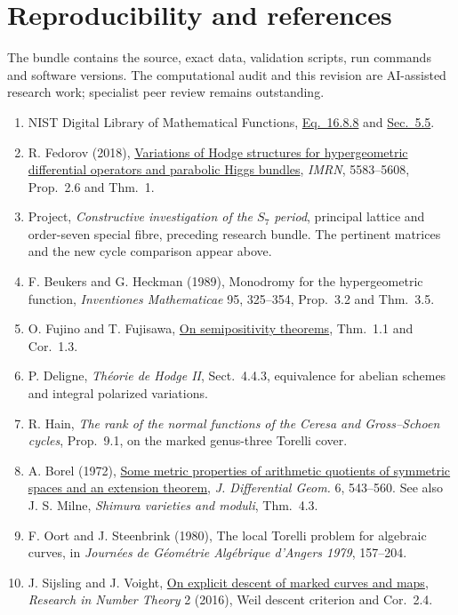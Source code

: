 \documentclass[10pt]{article}
\begin{document}
\clearpage\section*{Reproducibility and references}
The bundle contains the source, exact data, validation scripts, run commands and software versions. The computational audit and this revision are AI-assisted research work; specialist peer review remains outstanding.
\begin{enumerate}
\item NIST Digital Library of Mathematical Functions, \href{https://dlmf.nist.gov/16.8.E8}{Eq.~16.8.8} and \href{https://dlmf.nist.gov/5.5}{Sec.~5.5}.
\item R. Fedorov (2018), \href{https://doi.org/10.1093/imrn/rnx044}{Variations of Hodge structures for hypergeometric differential operators and parabolic Higgs bundles}, \emph{IMRN}, 5583--5608, Prop.~2.6 and Thm.~1.
\item Project, \emph{Constructive investigation of the $S_7$ period}, principal lattice and order-seven special fibre, preceding research bundle. The pertinent matrices and the new cycle comparison appear above.
\item F. Beukers and G. Heckman (1989), Monodromy for the hypergeometric function, \emph{Inventiones Mathematicae} 95, 325--354, Prop.~3.2 and Thm.~3.5.
\item O. Fujino and T. Fujisawa, \href{https://www.math.kyoto-u.ac.jp/~fujino/OnSemipositivity6.pdf}{On semipositivity theorems}, Thm.~1.1 and Cor.~1.3.
\item P. Deligne, \emph{Th\'eorie de Hodge II}, Sect.~4.4.3, equivalence for abelian schemes and integral polarized variations.
\item R. Hain, \emph{The rank of the normal functions of the Ceresa and Gross--Schoen cycles}, Prop.~9.1, on the marked genus-three Torelli cover.
\item A. Borel (1972), \href{https://doi.org/10.4310/jdg/1214430642}{Some metric properties of arithmetic quotients of symmetric spaces and an extension theorem}, \emph{J. Differential Geom.} 6, 543--560. See also J. S. Milne, \emph{Shimura varieties and moduli}, Thm.~4.3.
\item F. Oort and J. Steenbrink (1980), The local Torelli problem for algebraic curves, in \emph{Journ\'ees de G\'eom\'etrie Alg\'ebrique d'Angers 1979}, 157--204.
\item J. Sijsling and J. Voight, \href{https://doi.org/10.1007/s40993-016-0057-3}{On explicit descent of marked curves and maps}, \emph{Research in Number Theory} 2 (2016), Weil descent criterion and Cor.~2.4.
\end{enumerate}
\end{document}
